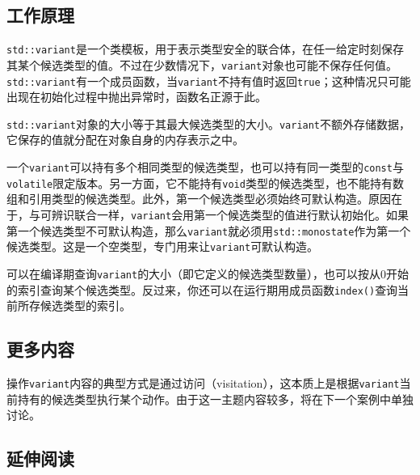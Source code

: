 
\subsection{工作原理}



\texttt{std::\allowbreak{}variant}是一个类模板，用于表示类型安全的联合体，在任一给定时刻保存其某个候选类型的值。不过在少数情况下，\texttt{variant}对象也可能不保存任何值。\texttt{std::\allowbreak{}variant}有一个成员函数，当\texttt{variant}不持有值时返回\texttt{true}；这种情况只可能出现在初始化过程中抛出异常时，函数名正源于此。



\texttt{std::\allowbreak{}variant}对象的大小等于其最大候选类型的大小。\texttt{variant}不额外存储数据，它保存的值就分配在对象自身的内存表示之中。



一个\texttt{variant}可以持有多个相同类型的候选类型，也可以持有同一类型的\texttt{const}与\texttt{volatile}限定版本。另一方面，它不能持有\texttt{void}类型的候选类型，也不能持有数组和引用类型的候选类型。此外，第一个候选类型必须始终可默认构造。原因在于，与可辨识联合一样，\texttt{variant}会用第一个候选类型的值进行默认初始化。如果第一个候选类型不可默认构造，那么\texttt{variant}就必须用\texttt{std::\allowbreak{}monostate}作为第一个候选类型。这是一个空类型，专门用来让\texttt{variant}可默认构造。



可以在编译期查询\texttt{variant}的大小（即它定义的候选类型数量），也可以按从0开始的索引查询某个候选类型。反过来，你还可以在运行期用成员函数\texttt{index()}查询当前所存候选类型的索引。



\subsection{更多内容}



操作\texttt{variant}内容的典型方式是通过访问（visitation），这本质上是根据\texttt{variant}当前持有的候选类型执行某个动作。由于这一主题内容较多，将在下一个案例中单独讨论。



\subsection{延伸阅读}


